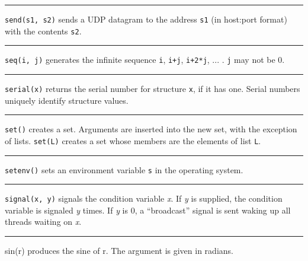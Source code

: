 \bigskip\hrule\vspace{0.1cm}

\noindent
{}\texttt{send(s1, s2)} sends a UDP datagram to the
address \texttt{s1} (in host:port format) with the contents
\texttt{s2}.

\bigskip\hrule\vspace{0.1cm}

\noindent
{}\texttt{seq(i, j)} generates the
infinite sequence \texttt{i}, \texttt{i+j}, \texttt{i+2*j}, ... .
\texttt{j} may not be 0.

\bigskip\hrule\vspace{0.1cm}

\noindent
{}\texttt{serial(x)} returns the serial number for
structure \texttt{x}, if it has one. Serial numbers uniquely identify
structure values.

\bigskip\hrule\vspace{0.1cm}

\noindent
{}\texttt{set()} creates a set. Arguments
are inserted into the new set, with the exception of lists.
\texttt{set(L)} creates a set whose members are the elements of list
\texttt{L}.

\bigskip\hrule\vspace{0.1cm}

\noindent
{}\texttt{setenv()} sets an environment variable
\texttt{s} in the operating system.

\bigskip\hrule\vspace{0.1cm}

\noindent
{}\texttt{signal(x, y)} signals the condition variable
{\textit x}. If {\textit y} is supplied, the condition variable is
signaled {\textit y} times. If {\textit y} is 0, a ``broadcast''
signal is sent waking up all threads waiting on {\textit x}.

\bigskip\hrule\vspace{0.1cm}

\noindent
{}sin(r) produces the sine of r. The argument is given in
radians.


